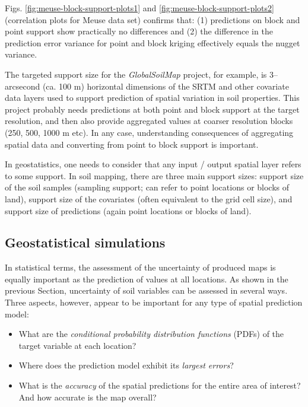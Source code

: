 \documentclass[11pt]{krantz}
\makeatletter
\newenvironment{kframe}{%
\medskip{}
\setlength{\fboxsep}{.8em}
 \def\at@end@of@kframe{}%
 \ifinner\ifhmode%
  \def\at@end@of@kframe{\end{minipage}}%
  \begin{minipage}{\columnwidth}%
 \fi\fi%
 \def\FrameCommand##1{\hskip\@totalleftmargin \hskip-\fboxsep
 \colorbox{shadecolor}{##1}\hskip-\fboxsep
     \hskip-\linewidth \hskip-\@totalleftmargin \hskip\columnwidth}%
 \MakeFramed {\advance\hsize-\width
   \@totalleftmargin\z@ \linewidth\hsize
   \@setminipage}}%
 {\par\unskip\endMakeFramed%
 \at@end@of@kframe}
\newenvironment{rmdblock}[1]
  {
  \begin{itemize}
  \renewcommand{\labelitemi}{
    \raisebox{-.7\height}[0pt][0pt]{
      {\setkeys{Gin}{width=3em,keepaspectratio}\texttt{[image: images/\#1]}}
    }
  }
  \setlength{\fboxsep}{1em}
  \begin{kframe}
  \item
  }
  {
  \end{kframe}
  \end{itemize}
  }
\newenvironment{rmdnote}
  {\begin{rmdblock}{note}}
  {\end{rmdblock}}
\theoremstyle{definition}
\theoremstyle{definition}
\theoremstyle{definition}
\theoremstyle{remark}
\makeatother
\begin{document}
Figs. \ref{fig:meuse-block-support-plots1} and
\ref{fig:meuse-block-support-plots2} (correlation plots for Meuse data
set) confirms that: (1) predictions on block and point support show
practically no differences and (2) the difference in the prediction
error variance for point and block kriging effectively equals the nugget
variance.

The targeted support size for the \emph{GlobalSoilMap} project, for
example, is 3--arcsecond (ca. 100 m) horizontal dimensions of the SRTM
and other covariate data layers used to support prediction of spatial
variation in soil properties. This project probably needs predictions at
both point and block support at the target resolution, and then also
provide aggregated values at coarser resolution blocks (250, 500, 1000 m
etc). In any case, understanding consequences of aggregating spatial
data and converting from point to block support is important.

\begin{rmdnote}
In geostatistics, one needs to consider that any input / output spatial
layer refers to some support. In soil mapping, there are three main
support sizes: support size of the soil samples (sampling support; can
refer to point locations or blocks of land), support size of the
covariates (often equivalent to the grid cell size), and support size of
predictions (again point locations or blocks of land).
\end{rmdnote}

\hypertarget{gstat-sims}{%
\subsection{Geostatistical simulations}\label{gstat-sims}}

In statistical terms, the assessment of the uncertainty of produced maps
is equally important as the prediction of values at all locations. As
shown in the previous Section, uncertainty of soil variables can be
assessed in several ways. Three aspects, however, appear to be important
for any type of spatial prediction model:

\begin{itemize}
\item
  What are the \emph{conditional probability distribution functions}
  (PDFs) of the target variable at each location?
\item
  Where does the prediction model exhibit its \emph{largest errors}?
\item
  What is the \emph{accuracy} of the spatial predictions for the entire
  area of interest? And how accurate is the map overall?
\end{itemize}
\end{document}
